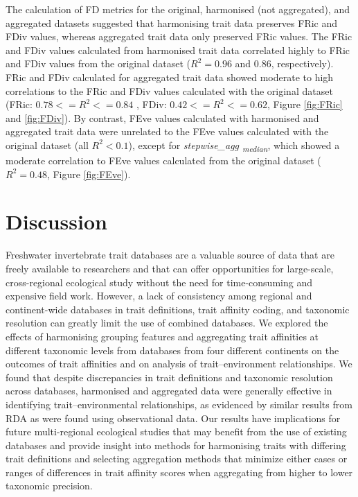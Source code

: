\documentclass[12pt]{article}
\begin{document}
The calculation of FD metrics for the original, harmonised (not aggregated), and aggregated datasets suggested that harmonising trait data preserves FRic and FDiv values, whereas aggregated trait data only preserved FRic values. The FRic and FDiv values calculated from harmonised trait data correlated highly to FRic and FDiv values from the original dataset ($R^2 = 0.96$ and $0.86$, respectively). FRic and FDiv calculated for aggregated trait data showed moderate to high correlations to the FRic and FDiv values calculated with the original dataset (FRic: $0.78 <= R^2 <= 0.84$ , FDiv: $0.42 <= R^2 <= 0.62$, Figure \ref{fig:FRic} and \ref{fig:FDiv}). By contrast, FEve values calculated with harmonised and aggregated trait data were unrelated to the FEve values calculated with the original dataset (all $R^2 < 0.1$), except for \textit{stepwise\_agg \textsubscript{median}}, which showed a moderate correlation to FEve values calculated from the original dataset ($R^2  = 0.48$, Figure \ref{fig:FEve}).

\newpage


\section*{Discussion}

Freshwater invertebrate trait databases are a valuable source of data that are freely available to researchers and that can offer opportunities for large-scale, cross-regional ecological study without the need for time-consuming and expensive field work. However, a lack of consistency among regional and continent-wide databases in trait definitions, trait affinity coding, and taxonomic resolution can greatly limit the use of combined databases. We explored the effects of harmonising grouping features and aggregating trait affinities at different taxonomic levels from databases from four different continents on the outcomes of trait affinities and on analysis of trait–environment relationships. We found that despite discrepancies in trait definitions and taxonomic resolution across databases, harmonised and aggregated data were generally effective in identifying trait–environmental relationships, as evidenced by similar results from RDA as were found using observational data. Our results have implications for future multi-regional ecological studies that may benefit from the use of existing databases and provide insight into methods for harmonising traits with differing trait definitions and selecting aggregation methods that minimize either cases or ranges of differences in trait affinity scores when aggregating from higher to lower taxonomic precision.
\end{document}
